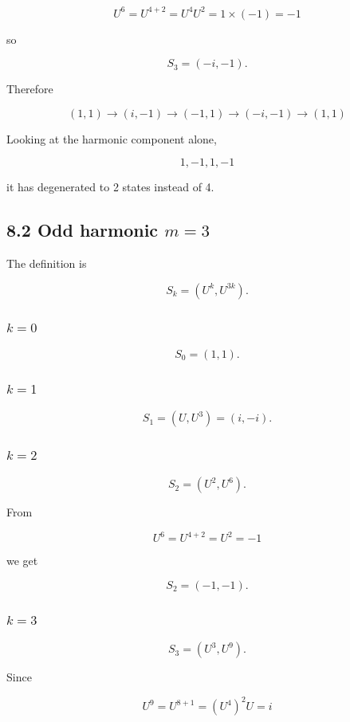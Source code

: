 \documentclass[
  a4paper,
]{article}
\begin{document}
\[
U^6
=
U^{4+2}
=
U^4U^2
=
1\times(-1)
=
-1
\]

so

\[
S_3
=
(-i,-1).
\]

Therefore

\[
\boxed{
(1,1)
\to
(i,-1)
\to
(-1,1)
\to
(-i,-1)
\to
(1,1)
}
\]

Looking at the harmonic component alone,

\[
1,-1,1,-1
\]

it has degenerated to 2 states instead of 4.

\subsection{\texorpdfstring{8.2 Odd harmonic
\(m=3\)}{8.2 Odd harmonic m=3}}\label{odd-harmonic-m3}

The definition is

\[
S_k
=
(U^k,U^{3k}).
\]

\subsubsection{\texorpdfstring{\(k=0\)}{k=0}}\label{k0-1}

\[
S_0
=
(1,1).
\]

\subsubsection{\texorpdfstring{\(k=1\)}{k=1}}\label{k1-1}

\[
S_1
=
(U,U^3)
=
(i,-i).
\]

\subsubsection{\texorpdfstring{\(k=2\)}{k=2}}\label{k2-1}

\[
S_2
=
(U^2,U^6).
\]

From

\[
U^6
=
U^{4+2}
=
U^2
=
-1
\]

we get

\[
S_2
=
(-1,-1).
\]

\subsubsection{\texorpdfstring{\(k=3\)}{k=3}}\label{k3-1}

\[
S_3
=
(U^3,U^9).
\]

Since

\[
U^9
=
U^{8+1}
=
(U^4)^2U
=
i
\]
\end{document}
